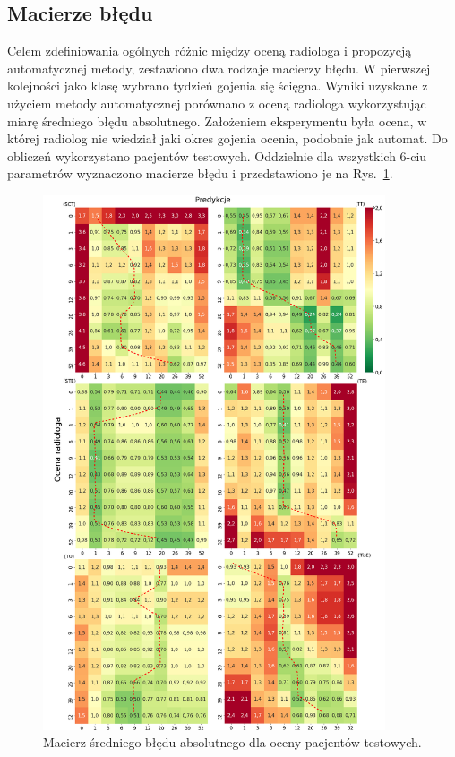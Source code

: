 \subsection{Macierze błędu}

Celem zdefiniowania ogólnych różnic między oceną radiologa i propozycją automatycznej metody, zestawiono dwa rodzaje macierzy błędu. W pierwszej kolejności jako klasę wybrano tydzień gojenia się ścięgna. Wyniki uzyskane z użyciem metody automatycznej porównano z oceną radiologa wykorzystując miarę średniego błędu absolutnego. Założeniem eksperymentu była ocena, w której radiolog nie wiedział jaki okres gojenia ocenia, podobnie jak automat. Do obliczeń wykorzystano pacjentów testowych. Oddzielnie dla wszystkich 6-ciu parametrów wyznaczono macierze błędu i przedstawiono je na Rys.~\ref{fig:CM_MAE}. 
\begin{figure}[]
	\centering
	\includegraphics[width=0.9\textwidth]{figures/cm.png}
	\caption{Macierz średniego błędu absolutnego dla oceny pacjentów testowych.}\label{fig:CM_MAE}
\end{figure}

